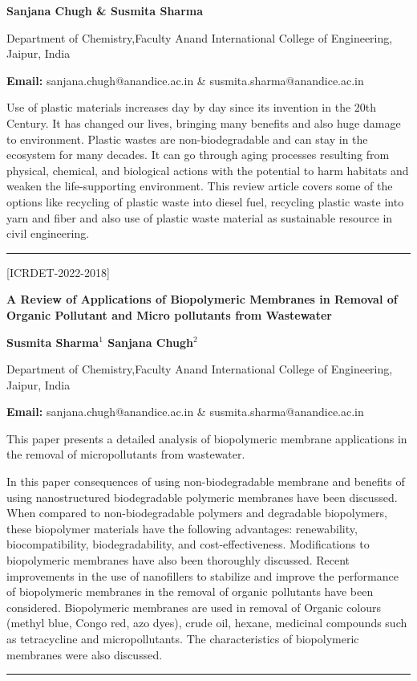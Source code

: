 \documentclass[twoside,11pt]{amsart}
\begin{document}
\centerline{\textbf{Sanjana Chugh \& Susmita Sharma  }}
\vskip 5mm
\begin{flushleft}
Department of Chemistry,Faculty Anand International College of Engineering, Jaipur, India
\vskip 5mm
\end{flushleft}
\vskip 2mm
\begin{flushleft}
{\bf Email:} sanjana.chugh@anandice.ac.in \& susmita.sharma@anandice.ac.in
\end{flushleft}
\vskip 5mm
Use of plastic materials increases day by day since its invention in the 20th Century. It has
changed our lives, bringing many benefits and also huge damage to environment. Plastic wastes
are non-biodegradable and can stay in the ecosystem for many decades. It can go through aging
processes resulting from physical, chemical, and biological actions with the potential to harm
habitats and weaken the life-supporting environment. This review article covers some of the
options like recycling of plastic waste into diesel fuel, recycling plastic waste into yarn and fiber
and also use of plastic waste material as sustainable resource in civil engineering.
\vskip 2mm
\rule{\textwidth}{0.5pt}
\vskip 5mm
\begin{flushleft}
\centerline{[ICRDET-2022-2018]}
\end{flushleft}
\begin{center}\bf\LARGE
A Review of Applications of Biopolymeric Membranes in Removal of Organic Pollutant and Micro pollutants from Wastewater
\end{center}
\vskip 5mm

\centerline{\textbf{ Susmita Sharma$^{1}$ Sanjana Chugh$^{2}$ }}
\vskip 5mm
\begin{flushleft}
Department of Chemistry,Faculty Anand International College of Engineering, Jaipur, India
\vskip 5mm
\end{flushleft}
\vskip 2mm
\begin{flushleft}
{\bf Email:} sanjana.chugh@anandice.ac.in \& susmita.sharma@anandice.ac.in
\end{flushleft}
\vskip 5mm
This paper presents a detailed analysis of biopolymeric membrane applications in the removal of micropollutants from wastewater.
\vskip 2mm
\newpage
\vskip 2mm

In this paper consequences of using non-biodegradable membrane and benefits of using nanostructured biodegradable polymeric membranes have been discussed. When compared to non-biodegradable polymers and degradable biopolymers, these biopolymer materials have the following advantages: renewability, biocompatibility, biodegradability, and cost-effectiveness. Modifications to biopolymeric membranes have also been thoroughly discussed. Recent improvements in the use of nanofillers to stabilize and improve the performance of biopolymeric membranes in the removal of organic pollutants have been considered. Biopolymeric membranes are used in removal of Organic colours (methyl blue, Congo red, azo dyes), crude oil, hexane, medicinal compounds such as tetracycline and micropollutants. The characteristics of biopolymeric membranes were also discussed.
\vskip 2mm
\rule{\textwidth}{0.5pt}
\end{document}
